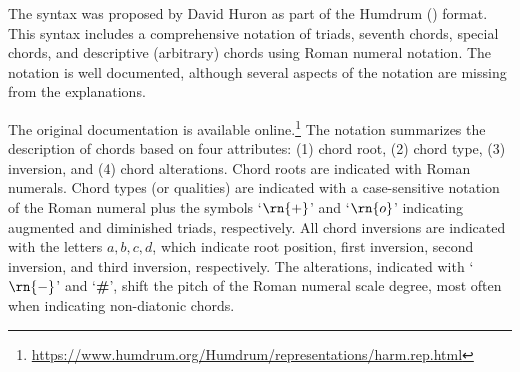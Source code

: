 The  syntax was proposed by David Huron as part
of the Humdrum () format. This syntax includes
a comprehensive notation of triads, seventh chords, special
chords, and descriptive (arbitrary) chords using Roman
numeral notation. The notation is well documented, although
several aspects of the notation are missing from the
explanations.

The original  documentation is available
online.\footnote{\href{https://www.humdrum.org/Humdrum/representations/harm.rep.html}{https://www.humdrum.org/Humdrum/representations/harm.rep.html}}
The notation summarizes the description of chords based on
four attributes: (1) chord root, (2) chord type, (3)
inversion, and (4) chord alterations. Chord roots are
indicated with Roman numerals. Chord types (or qualities)
are indicated with a case-sensitive notation of the Roman
numeral plus the symbols `$\rn{+}$' and `$\rn{o}$'
indicating augmented and diminished triads, respectively.
All chord inversions are indicated with the letters ${a, b,
c, d}$, which indicate root position, first inversion,
second inversion, and third inversion, respectively. The
alterations, indicated with `$\rn{-}$' and
`\textbf{\#}', shift the pitch of the Roman numeral
scale degree, most often when indicating non-diatonic
chords.

